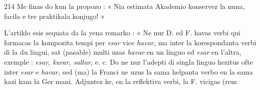 \begin{VUpage}[218]{214}
Me finas do kun la propozo : « Nia estimata Akademio\nl
konservez la nuna, facila e tre praktikala konjugo! »

L'artiklo esis sequata da la yena remarko : « Ne nur D.\nl
ed F. havas verbi qui formacas la kompozita tempi per \textit{esar}\nl
vice \textit{havar,} ma inter la korespondanta verbi di la du lingui,\nl
sat (pasable) multi uzas \textit{havar} en un linguo ed \textit{esar} en l'altra,\nl
exemple : \textit{esar, kurar, saltar,} e. c. Do ne nur l'adepti di singla\nl
linguo hezitus ofte inter \textit{esar} e \textit{havar,} sed (ma) la Franci ne\nl
uzus la sama helpanta verbo en la sama kazi kam la Ger\cc
mani. Adjuntez ke, en la reflektiva verbi, la F. vicigas (rem\cc
\end{VUpage}

